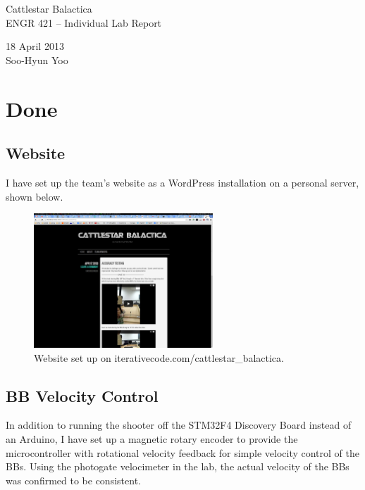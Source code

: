 \documentclass[12pt,letterpaper]{article}
\begin{document}
\begin{titlepage}
	\vspace*{4cm}
	\begin{flushright}
	{\huge
		Cattlestar Balactica \\ [1cm]
	}
	{\large
		ENGR 421 -- Individual Lab Report \\ [3cm]
	}
	\end{flushright}

	\begin{flushright}
	18 April 2013 \\
	Soo-Hyun Yoo
	\end{flushright}

\end{titlepage}

\newpage

\section*{Done}

\subsection*{Website}

I have set up the team's website as a WordPress installation on a personal
server, shown below.

\begin{figure}[!h]
	\centering
	\includegraphics[width=0.6\textwidth]{website.png}
	\caption{Website set up on iterativecode.com/cattlestar\_balactica.}
	\label{fig:website}
\end{figure}


\subsection*{BB Velocity Control}

In addition to running the shooter off the STM32F4 Discovery Board instead of
an Arduino, I have set up a magnetic rotary encoder to provide the
microcontroller with rotational velocity feedback for simple velocity control
of the BBs. Using the photogate velocimeter in the lab, the actual velocity of
the BBs was confirmed to be consistent.
\end{document}
